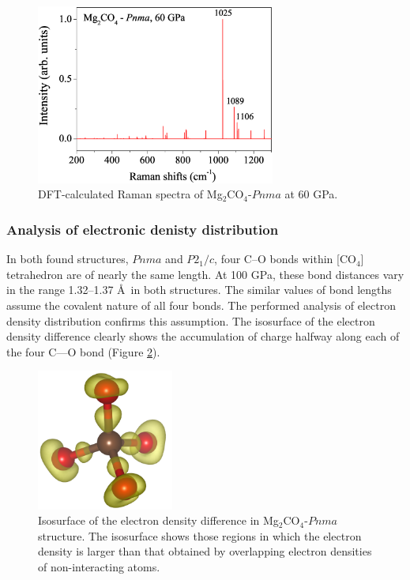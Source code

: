 \documentclass[a4paperm]{article}
\begin{document}
\begin{figure}[H]
	\includegraphics[width=0.7\textwidth]{raman_mg2co4} \centering
	\caption{
		{\color{blue}
		DFT-calculated Raman spectra of Mg$_2$CO$_4$-$Pnma$ at 60 GPa.
		}	
			} \label{raman}
\end{figure}


\subsubsection*{Analysis of electronic denisty distribution}

{\color{blue}
In both found structures, $Pnma$ and $P2_1/c$, four C--O bonds within [CO$_4$] tetrahedron are of nearly the same length.
At 100 GPa, these bond distances vary in the range 1.32--1.37 \AA\ in both structures. 
The similar values of bond lengths assume the covalent nature of all four bonds.
The performed analysis of electron density distribution confirms this assumption.
The isosurface of the electron density difference clearly shows the accumulation of charge halfway along each of the four C—O bond (Figure \ref{diff}).
}

\begin{figure}[H]
	\includegraphics[width=0.4\textwidth]{dens_diff.png} \centering
	\caption{
		{\color{blue}
		Isosurface of the electron density difference in Mg$_2$CO$_4$-$Pnma$ structure. The isosurface shows those regions in which the electron density is larger than that obtained by overlapping electron densities of non-interacting atoms.
		}
			} \label{diff}
\end{figure}
\end{document}
